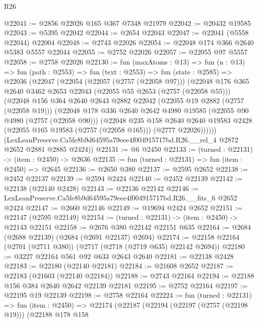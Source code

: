 \begin{lexlean}{R26}
\begin{coremodule}
@22041 := @2856 @22026 @165 @367 @7348 @21979
@22042 := @20432 @19585
@22043 := @5395 @22042
@22044 := @2654 @22043
@22047 := @22041 (@5558 @22044) @22004
@22048 := @2743 @22026
@22054 := @22048 @174 @366 @2640 @5383 @5557 @22044
@22055 := @2752 @22026
@22057 := @22055 @97 @5557
@22058 := @2758 @22026
@22130 := fun (maxAtoms : @13) =>
  fun (n : @13) =>
  fun (path : @2553) =>
  fun (text : @2553) =>
  fun (state : @2585) =>
  @22036
    (@22047
      (@22054
        (@22057 (@2757 (@22058 @97)))
        (@22048
          @176
          @365
          @2640
          @3462
          @2653
          @22043
          (@22055 @55 @2653 (@2757 (@22058 @55)))
          (@22048
            @156
            @364
            @2640
            @2643
            @2882
            @22042
            (@22055 @19 @2882 (@2757 (@22058 @19)))
            (@22048
              @178
              @336
              @2640
              @2642
              @4980
              @19585
              (@22055 @90 @4980 (@2757 (@22058 @90)))
              (@22048
                @235
                @158
                @2640
                @2640
                @19583
                @2428
                (@22055 @165 @19583 (@2757 (@22058 @165)))
                (@2777 @22026))))))
      (LexLeanPreserve.Ca5fe8b9d64595a79eee4f004915717bd.R26.__rel_4 @2872 @2652 @2881 @2885 @2424))
@22131 := @6 @2450
@22133 := (turned : @22131) -> (item : @2450) -> @2636
@22135 := fun (turned : @22131) => fun (item : @2450) => @2645
@22136 := @2650 @380
@22137 := @2595 @2652
@22138 := @2452 @22137
@22139 := @2594 @2424
@22140 := @2452 @22139
@22142 := @22138 (@22140 @2428)
@22143 := @22136 @22142
@22146 := LexLeanPreserve.Ca5fe8b9d64595a79eee4f004915717bd.R26.__fits_6 @2652 @2424
@22147 := @2660 @22146
@22149 := @19694 @2424 @2652
@22151 := @22147 (@2595 @22149)
@22154 := (turned : @22131) -> (item : @2450) -> @22143 @22151
@22158 := @2676 @380 @22142 @22151 @635
@22164 := @2684 (@2688 @22139) (@2684 (@2691 @22137) @2694)
@22174 := @22158 @22164 (@2701 (@2711 @380)) (@2717 (@2718 (@2719 @635) @22142 @2694))
@22180 := @3227 @22164 @561 @92 @633 @2643 @2640
@22181 := @22138 @2428
@22183 := @22180 (@22140 @22181)
@22184 := @21608 @2652
@22187 := @22183 (@21603 (@22140 @22184))
@22188 := @2743 @22164
@22194 := @22188 @156 @384 @2640 @2642 @22139 @22181
@22195 := @2752 @22164
@22197 := @22195 @19 @22139
@22198 := @2758 @22164
@22224 := fun (turned : @22131) =>
  fun (item : @2450) =>
  @22174
    (@22187
      (@22194
        (@22197 (@2757 (@22198 @19)))
        (@22188
          @178
          @158

\end{coremodule}
\end{lexlean}
